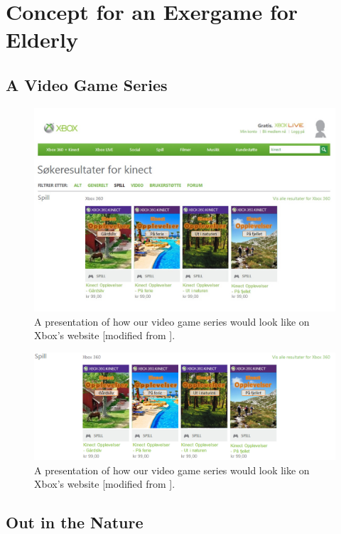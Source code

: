 \chapter{Concept for an Exergame for Elderly}


\section{A Video Game Series}
\begin{figure} [ht!]
\centering
\includegraphics[scale=0.5, angle=90]{SpillXboxNYNY.jpg}
\caption[Presentation of our video game series]{A presentation of how our video game series would look like on Xbox's website [modified from \cite{XboxNettside}].}
\label{fig:videogameseries}
\end{figure}

\begin{figure} [ht!]
\centering
\includegraphics[scale=0.7, angle=90]{SpillXboxNY.png}
\caption[Presentation of our video game series]{A presentation of how our video game series would look like on Xbox's website [modified from \cite{XboxNettside}].}
\label{fig:videogameseries}
\end{figure}

\section{Out in the Nature}

